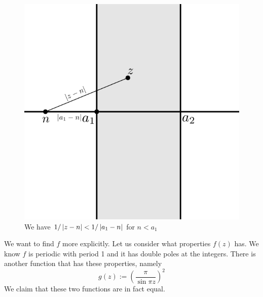 \begin{figure}[ht]
    \centering
    \includegraphics[scale=0.75]{Images/vertical_strip_compare.png}
    \caption{We have $1/\left|z - n\right| < 1/\left|a_1 - n\right|$ for $n < a_1$}
    \label{fig:vertical-strip-compare}
\end{figure}

We want to find $f$ more explicitly. Let us consider what properties $f(z)$ has. We know $f$ is periodic with period 1 and it has double poles at the integers. There is another function that has these properties, namely
$$g(z) := \left( \frac{\pi}{\sin \pi z} \right)^2$$
We claim that these two functions are in fact equal.